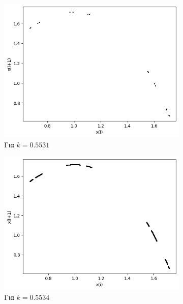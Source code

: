 \begin{figure}[ht]
	\begin{subfigure}[b]{0.4\textwidth}
		\centering
		\includegraphics[width=\textwidth]{LateX images/graphs q05/g7}
		\caption{Για $k=0.5531$}
		\label{f:k31}
	\end{subfigure}
	\hfill
	\begin{subfigure}[b]{0.4\textwidth}
		\centering
		\includegraphics[width=\textwidth]{LateX images/graphs q05/g8}
		\caption{Για $k=0.5534$}
		\label{f:k32}
	\end{subfigure}
	\hfill
	\begin{subfigure}[c]{0.4\textwidth}
		\centering

\end{subfigure}
\end{figure}
